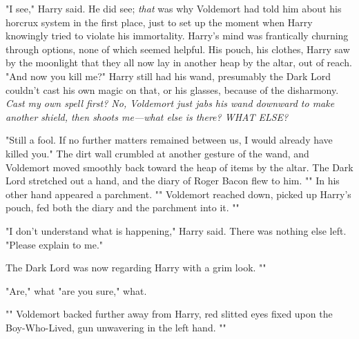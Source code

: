"I see," Harry said. He did see; \emph{that} was why Voldemort had told him
about his horcrux system in the first place, just to set up the moment when
Harry knowingly tried to violate his immortality. Harry's mind was frantically
churning through options, none of which seemed helpful. His pouch, his clothes,
Harry saw by the moonlight that they all now lay in another heap by the altar,
out of reach. "And now you kill me?" Harry still had his wand, presumably the
Dark Lord couldn't cast his own magic on that, or his glasses, because of the
disharmony. \emph{Cast my own spell first? No, Voldemort just jabs his wand
downward to make another shield, then shoots me—what else is there? WHAT
ELSE?}

"Still a fool. If no further matters remained between us, I would already have
killed you." The dirt wall crumbled at another gesture of the wand, and
Voldemort moved smoothly back toward the heap of items by the altar. The Dark
Lord stretched out a hand, and the diary of Roger Bacon flew to him.
"" In
his other hand appeared a parchment. "" Voldemort reached down, picked up Harry's pouch, fed both
the diary and the parchment into it. ""

"I don't understand what is happening," Harry said. There was nothing else
left. "Please explain to me."

The Dark Lord was now regarding Harry with a grim look. ""

"Are," what "are you sure," what.

"" Voldemort backed further away
from Harry, red slitted eyes fixed upon the Boy-Who-Lived, gun unwavering in
the left hand. ""

